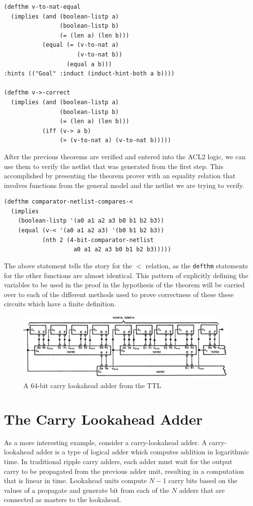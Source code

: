 \documentclass[fleqn,10pt]{SelfArx} %
\begin{document}
\begin{lstlisting}
(defthm v-to-nat-equal
  (implies (and (boolean-listp a)
                (boolean-listp b)
                (= (len a) (len b)))
           (equal (= (v-to-nat a)
                     (v-to-nat b))                   
                  (equal a b)))  
:hints (("Goal" :induct (induct-hint-both a b))))
  
(defthm v->-correct
  (implies (and (boolean-listp a)
                (boolean-listp b)
                (= (len a) (len b)))
           (iff (v-> a b)
                (> (v-to-nat a) (v-to-nat b)))))
\end{lstlisting}

After the previous theorems are verified and entered into the ACL2 logic, we can use them to verify the netlist that was generated from the first step. This accomplished by presenting the theorem prover with an equality relation that involves functions from the general model and the netlist we are trying to verify. 

\begin{lstlisting}
(defthm comparator-netlist-compares-<
  (implies 
    (boolean-listp '(a0 a1 a2 a3 b0 b1 b2 b3))
    (equal (v-< '(a0 a1 a2 a3) '(b0 b1 b2 b3))
           (nth 2 (4-bit-comparator-netlist 
                    a0 a1 a2 a3 b0 b1 b2 b3)))))
\end{lstlisting}

The above statement tells the story for the $<$ relation, as the \lstinline{defthm} statements for the other functions are almost identical. This pattern of explicitly defining the variables to be used in the proof in the hypothesis of the theorem will be carried over to each of the different methods used to prove correctness of these these circuits which have a finite definition.

\begin{figure}[ht]\centering
\caption{A 64-bit carry lookahead adder from the TTL\cite{TTL}}
\includegraphics[width=\linewidth]{lookahead.png}
\end{figure}
\section{The Carry Lookahead Adder}
As a more interesting example, consider a carry-lookahead adder. A carry-lookahead adder is a type of logical adder which computes addition in logarithmic time. In traditional ripple carry adders, each adder must wait for the output carry to be propagated from the previous adder unit, resulting in a computation that is linear in time. Lookahead units compute $N-1$ carry bits based on the values of a propagate and generate bit from each of the $N$ adders that are connected as masters to the lookahead.
\end{document}
